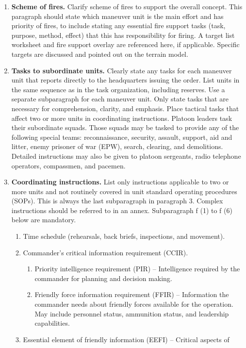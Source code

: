 \documentclass[letterpaper,tgtermes,9pt,microtype,colorlinks=true,urlcolor=blue,DIV=calc,pagesize]{scrartcl}
\begin{document}
\begin{enumerate}
\item \textbf{Scheme of fires.}
\label{sec:org7cf5873}
Clarify scheme of fires to support the overall concept. This paragraph should state which maneuver unit is the main effort and has priority of fires, to include stating any essential fire support tasks (task, purpose, method, effect) that this has responsibility for firing. A target list worksheet and fire support overlay are referenced here, if applicable. Specific targets are discussed and pointed out on the terrain model.
\item \textbf{Tasks to subordinate units.}
\label{sec:orgc1c07e4}
Clearly state any tasks for each maneuver unit that reports directly to the headquarters issuing the order. List units in the same sequence as in the task organization, including reserves. Use a separate subparagraph for each maneuver unit. Only state tasks that are necessary for comprehension, clarity, and emphasis. Place tactical tasks that affect two or more units in coordinating instructions. Platoon leaders task their subordinate squads. Those squads may be tasked to provide any of the following special teams: reconnaissance, security, assault, support, aid and litter, enemy prisoner of war (EPW), search, clearing, and demolitions. Detailed instructions may also be given to platoon sergeants, radio telephone operators, compassmen, and pacemen.
\item \textbf{Coordinating instructions.}
\label{sec:org6994d4d}
List only instructions applicable to two or more units and not routinely covered in unit standard operating procedures (SOPs). This is always the last subparagraph in paragraph 3. Complex instructions should be referred to in an annex. Subparagraph f (1) to f (6) below are mandatory.
\begin{enumerate}
\item Time schedule (rehearsals, back briefs, inspections, and movement).
\item Commander's critical information requirement (CCIR).
\begin{enumerate}
\item Priority intelligence requirement (PIR) – Intelligence required by the
commander for planning and decision making.
\item Friendly force information requirement (FFIR) – Information the commander
needs about friendly forces available for the operation. May include
personnel status, ammunition status, and leadership capabilities.
\end{enumerate}
\item Essential element of friendly information (EEFI) – Critical aspects of

\end{enumerate}
\end{enumerate}
\end{document}
